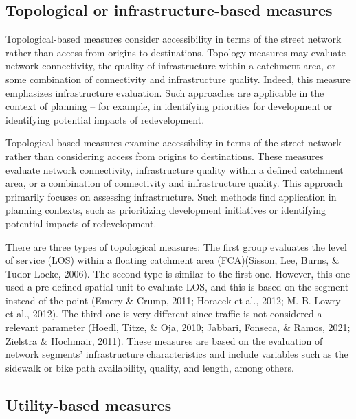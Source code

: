 \documentclass[
11pt, %
oneside, %
english, %
singlespacing, %
]{macthesis} %
\begin{document}
\hypertarget{topological-or-infrastructure-based-measures}{%
\subsection{Topological or infrastructure-based measures}\label{topological-or-infrastructure-based-measures}}

Topological-based measures consider accessibility in terms of the street network rather than access from origins to destinations. Topology measures may evaluate network connectivity, the quality of infrastructure within a catchment area, or some combination of connectivity and infrastructure quality. Indeed, this measure emphasizes infrastructure evaluation. Such approaches are applicable in the context of planning -- for example, in identifying priorities for development or identifying potential impacts of redevelopment.

Topological-based measures examine accessibility in terms of the street network rather than considering access from origins to destinations. These measures evaluate network connectivity, infrastructure quality within a defined catchment area, or a combination of connectivity and infrastructure quality. This approach primarily focuses on assessing infrastructure. Such methods find application in planning contexts, such as prioritizing development initiatives or identifying potential impacts of redevelopment.

There are three types of topological measures: The first group evaluates the level of service (LOS) within a floating catchment area (FCA)(Sisson, Lee, Burns, \& Tudor-Locke, 2006). The second type is similar to the first one. However, this one used a pre-defined spatial unit to evaluate LOS, and this is based on the segment instead of the point (Emery \& Crump, 2011; Horacek et al., 2012; M. B. Lowry et al., 2012). The third one is very different since traffic is not considered a relevant parameter (Hoedl, Titze, \& Oja, 2010; Jabbari, Fonseca, \& Ramos, 2021; Zielstra \& Hochmair, 2011). These measures are based on the evaluation of network segments' infrastructure characteristics and include variables such as the sidewalk or bike path availability, quality, and length, among others.

\hypertarget{utility-based-measures}{%
\subsection{Utility-based measures}\label{utility-based-measures}}
\end{document}
